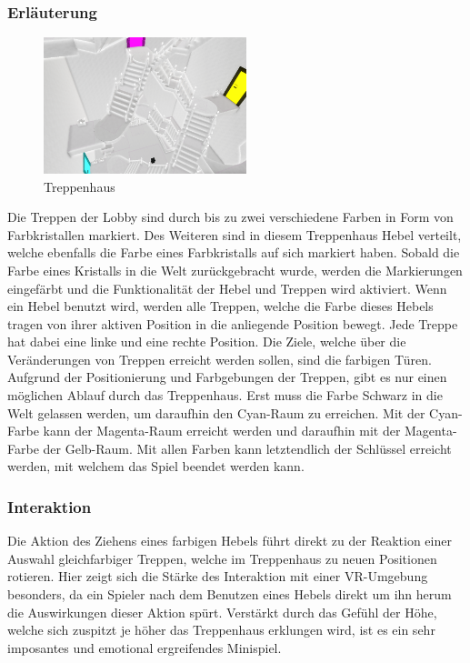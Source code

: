 \subsubsection{Erläuterung}
\begin{figure}
	\vspace*{-0.5cm}
	\includegraphics[width=5.9cm]{Pictures/Treppenhaus}
	\caption{Treppenhaus}
	\vspace*{-0.5cm}
	\label{fig:treppenhaus}
\end{figure}
Die Treppen der Lobby sind durch bis zu zwei verschiedene Farben in Form von Farbkristallen markiert. Des Weiteren sind in diesem Treppenhaus Hebel verteilt, welche ebenfalls die Farbe eines Farbkristalls auf sich markiert haben. Sobald die Farbe eines Kristalls in die Welt zurückgebracht wurde, werden die Markierungen eingefärbt und die Funktionalität der Hebel und Treppen wird aktiviert. Wenn ein Hebel benutzt wird, werden alle Treppen, welche die Farbe dieses Hebels tragen von ihrer aktiven Position in die anliegende Position bewegt. Jede Treppe hat dabei eine linke und eine rechte Position. Die Ziele, welche über die Veränderungen von Treppen erreicht werden sollen, sind die farbigen Türen. Aufgrund der Positionierung und Farbgebungen der Treppen, gibt es nur einen möglichen Ablauf durch das Treppenhaus. Erst muss die Farbe Schwarz in die Welt gelassen werden, um daraufhin den Cyan-Raum zu erreichen. Mit der Cyan-Farbe kann der Magenta-Raum erreicht werden und daraufhin mit der Magenta-Farbe der Gelb-Raum. Mit allen Farben kann letztendlich der Schlüssel erreicht werden, mit welchem das Spiel beendet werden kann.


\subsubsection{Interaktion}
\noindent Die Aktion des Ziehens eines farbigen Hebels führt direkt zu der Reaktion einer Auswahl gleichfarbiger Treppen, welche im Treppenhaus zu neuen Positionen rotieren. Hier zeigt sich die Stärke des Interaktion mit einer VR-Umgebung besonders, da ein Spieler nach dem Benutzen eines Hebels direkt um ihn herum die Auswirkungen dieser Aktion spürt. Verstärkt durch das Gefühl der Höhe, welche sich zuspitzt je höher das Treppenhaus erklungen wird, ist es ein sehr imposantes und emotional ergreifendes Minispiel.

